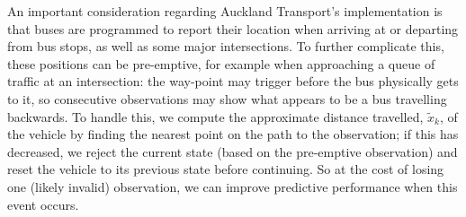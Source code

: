 An important consideration regarding Auckland Transport's \rt implementation is that
buses are programmed to report their location when arriving at or departing from
bus stops, as well as some major intersections.
To further complicate this,
these positions can be pre-emptive,
for example when approaching a queue of traffic at an intersection:
the way-point may trigger before the bus physically gets to it,
so consecutive observations may show what appears to be a bus travelling backwards.
To handle this, we compute the approximate distance travelled, $\tilde x_k$,
of the vehicle by finding the nearest point on the path to the observation;
if this has decreased, we reject the current state (based on the pre-emptive observation)
and reset the vehicle 
to its previous state before continuing.
So at the cost of losing one (likely invalid) observation,
we can improve predictive performance
when this event occurs.

